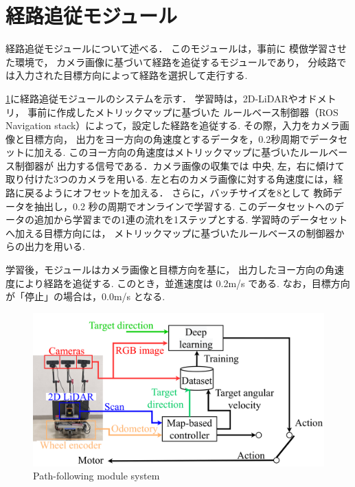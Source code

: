 \section{経路追従モジュール}
経路追従モジュールについて述べる．
このモジュールは，事前に 模倣学習させた環境で，
カメラ画像に基づいて経路を追従するモジュールであり，
分岐路では入力された目標方向によって経路を選択して走行する.

\ref{fig:learning_sys}に経路追従モジュールのシステムを示す．
学習時は，2D-LiDARやオドメトリ，
事前に作成したメトリックマップに基づいた
ルールベース制御器（ROS Navigation stack）によって，設定した経路を追従する.
その際，入力をカメラ画像と目標方向，
出力をヨー方向の角速度とするデータを，0.2秒周期でデータセットに加える.
このヨー方向の角速度はメトリックマップに基づいたルールベース制御器が
出力する信号である．カメラ画像の収集では
中央, 左，右に傾けて取り付けた3つのカメラを用いる.
左と右のカメラ画像に対する角速度には，経路に戻るようにオフセットを加える．
さらに，バッチサイズを8として
教師データを抽出し，0.2 秒の周期でオンラインで学習する.
このデータセットへのデータの追加から学習までの1連の流れを1ステップとする.
学習時のデータセットへ加える目標方向には，
メトリックマップに基づいたルールベースの制御器からの出力を用いる.

学習後，モジュールはカメラ画像と目標方向を基に，
出力したヨー方向の角速度により経路を追従する.
このとき，並進速度は 0.2m/s である.
なお，目標方向が「停止」の場合は，0.0m/s となる.
\begin{figure}[htbp]
    \centering
     \includegraphics[width=130mm]{images/pdf/system_learning.pdf}
     \caption{Path-following module system}\label{fig:learning_sys}
\end{figure}

